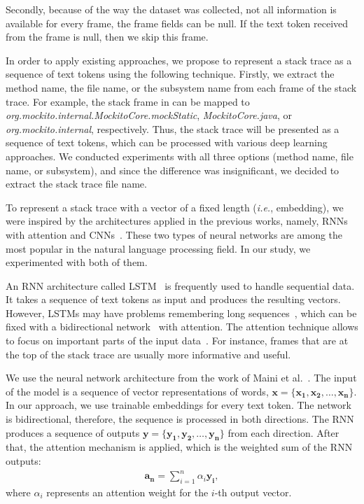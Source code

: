 Secondly, because of the way the dataset was collected, not all information is available for every frame, the frame fields can be null. If the text token received from the frame is null, then we skip this frame.

In order to apply existing approaches, we propose to represent a stack trace as a sequence of text tokens using the following technique. Firstly, we extract the method name, the file name, or the subsystem name from each frame of the stack trace. For example, the stack frame in  can be mapped to \textit{org.mockito.internal.MockitoCore.mockStatic}, \textit{MockitoCore.java}, or \textit{org.mockito.internal}, respectively. Thus, the stack trace will be presented as a sequence of text tokens, which can be processed with various deep learning approaches. We conducted experiments with all three options (method name, file name, or subsystem), and since the difference was insignificant, we decided to extract the stack trace file name.

\label{sec:vector-representation}

To represent a stack trace with a vector of a fixed length (\textit{i.e.}, embedding), we were inspired by the architectures applied in the previous works, namely, RNNs with attention and CNNs~\cite{Lee2017ApplyingDL, Guo2020DeveloperAM, Zaidi2020ApplyingCN, Mani2019DeepTriageET}. These two types of neural networks are among the most popular in the natural language processing field. In our study, we experimented with both of them.


An RNN architecture called LSTM~\cite{Hochreiter1997LongSM} is frequently used to handle sequential data. It takes a sequence of text tokens as input and produces the resulting vectors. However, LSTMs may have problems remembering long sequences~\cite{Vaswani2017AttentionIA}, which can be fixed with a bidirectional network~\cite{Graves2005BidirectionalLN} with attention. The attention technique allows to focus on important parts of the input data~\cite{Bahdanau2015NeuralMT}. For instance, frames that are at the top of the stack trace are usually more informative and useful. 

We use the neural network architecture from the work of Maini et al.~\cite{Mani2019DeepTriageET}. The input of the model is a sequence of vector representations of words, $\mathbf{x} = \{ \mathbf{x_1}, \mathbf{x_2}, \ldots, \mathbf{x_n} \}$. In our approach, we use trainable embeddings for every text token. The network is bidirectional, therefore, the sequence is processed in both directions. The RNN produces a sequence of outputs $\mathbf{y} = \{\mathbf{y_1}, \mathbf{y_2}, \ldots, \mathbf{y_n} \}$ from each direction. After that, the attention mechanism is applied, which is the weighted sum of the RNN outputs:
\begin{align}
    \mathbf{a_n} = \sum_{i = 1}^{n} \alpha_i \mathbf{y_i},
\end{align}
where $\alpha_i$ represents an attention weight for the $i$-th output vector. 


